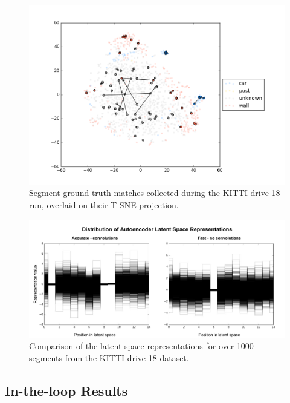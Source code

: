 \begin{figure}
  \centering
  \includegraphics[width=5.2in]{images/t-sne_matches.png}
  \caption{Segment ground truth matches collected during the KITTI drive 18 run, overlaid on their T-SNE projection.}
  \label{fig:fastvaccurate-features}
\end{figure}

\begin{figure}
  \centering
  \includegraphics[width=5.2in]{images/fastvaccuratefeatures.pdf}
  \caption{Comparison of the latent space representations for over 1000 segments from the KITTI drive 18 dataset.}
  \label{fig:fastvaccurate-features}
\end{figure}

\subsection{In-the-loop Results}


